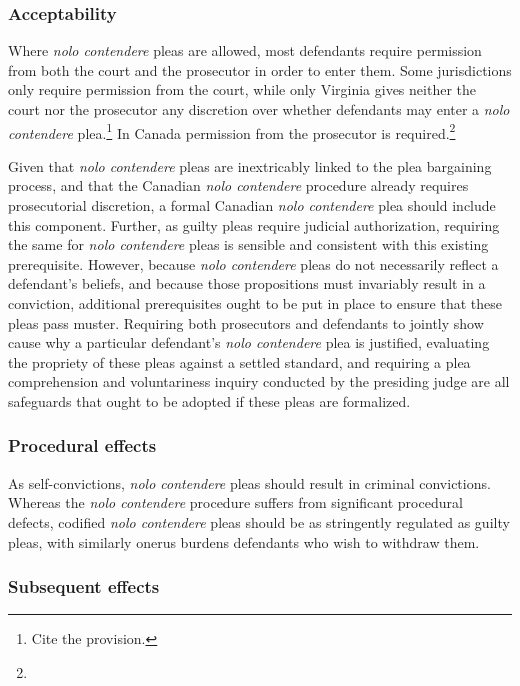 \subsubsection{Acceptability}

Where \textit{nolo contendere} pleas are allowed, most defendants require permission from both the court and the prosecutor in order to enter them. Some jurisdictions only require permission from the court, while only Virginia gives neither the court nor the prosecutor any discretion over whether defendants may enter a \textit{nolo contendere} plea.\footnote{Cite the provision.} In Canada permission from the prosecutor is required.\footnote{} 

Given that \textit{nolo contendere} pleas are inextricably linked to the plea bargaining process, and that the Canadian \textit{nolo contendere} procedure already requires prosecutorial discretion, a formal Canadian \textit{nolo contendere} plea should include this component. Further, as guilty pleas require judicial authorization, requiring the same for \textit{nolo contendere} pleas is sensible and consistent with this existing prerequisite. However, because \textit{nolo contendere} pleas do not necessarily reflect a defendant's beliefs, and because those propositions must invariably result in a conviction, additional prerequisites ought to be put in place to ensure that these pleas pass muster. Requiring both prosecutors and defendants to jointly show cause why a particular defendant's \textit{nolo contendere} plea is justified, evaluating the propriety of these pleas against a settled standard, and requiring a plea comprehension and voluntariness inquiry conducted by the presiding judge are all safeguards that ought to be adopted if these pleas are formalized.

\subsubsection{Procedural effects}

As self-convictions, \textit{nolo contendere} pleas should result in criminal convictions. Whereas the \textit{nolo contendere} procedure suffers from significant procedural defects, codified \textit{nolo contendere} pleas should be as stringently regulated as guilty pleas, with similarly onerus burdens defendants who wish to withdraw them.

\subsubsection{Subsequent effects}

